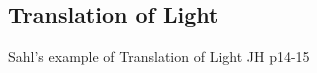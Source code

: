 \subsection{Translation of Light}
\begin{frame}[t]{Sahl's example of Translation of Light}
JH p14-15

\end{frame}